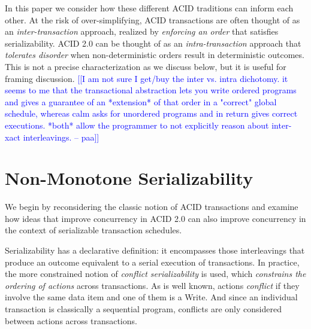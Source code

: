 \documentclass{sig-alternate}
\newcommand{\paa}[1]{{\textcolor{blue}{[[#1 -- paa]]}}}
\begin{document}
In this paper we consider how these different ACID traditions can inform each other.  At the risk of over-simplifying, ACID transactions are often thought of as an \emph{inter-transaction} approach, realized by \emph{enforcing an order} that satisfies serializability.  ACID 2.0 can be thought of as an \emph{intra-transaction} approach that \emph{tolerates disorder} when non-deterministic orders result in deterministic outcomes.  This is not a precise characterization as we discuss below, but it is useful for framing discussion.
\paa{I am not sure I get/buy the inter vs. intra dichotomy.  it seems to me that the transactional abstraction lets you write ordered programs and gives a guarantee of an *extension* of that order in a "correct" global schedule, whereas calm asks for unordered programs and in return gives correct executions.  *both* allow the programmer to not explicitly reason about inter-xact interleavings.}

\section{Non-Monotone Serializability}
We begin by reconsidering the classic notion of ACID transactions and examine how ideas that improve concurrency in ACID 2.0 can also improve concurrency in the context of serializable transaction schedules.

Serializability has a declarative definition: it encompasses those interleavings that produce an outcome equivalent to a serial execution of transactions.  In practice, the more constrained notion of \emph{conflict serializability} is used, which \emph{constrains the ordering of actions} across transactions.  As is well known, actions \emph{conflict} if they involve the same data item and one of them is a Write.  And since an individual transaction is classically a sequential program, conflicts are only considered between actions across transactions.
\end{document}
